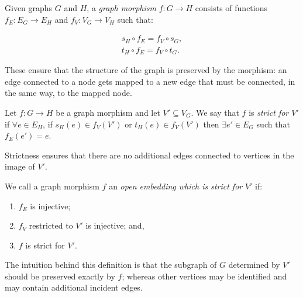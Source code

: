 \documentclass[runningheads]{llncs}
\begin{document}
Given graphs $G$ and $H$, a \emph{graph morphism} $f : G\to H$
consists of functions $f_E : E_G \to E_H$ and $f_V:V_G\to V_H$ such
that:

\begin{gather}
  s_H\circ f_E = f_V \circ s_G,\label{eq:graph-hom1}\\
  t_H\circ f_E = f_V \circ t_G\label{eq:graph-hom2}.
\end{gather}

\noindent These ensure that the structure of the graph is preserved by
the morphism: an edge connected to a node gets mapped to a new edge
that must be connected, in the same way, to the mapped node.


\begin{definition}
  Let $f: G \to H$ be a graph morphism and let $V' \subseteq V_G$. We
  say that $f$ is \emph{strict for $V'$} if $\forall e \in E_H$, if
  $s_H(e) \in f_V(V')$ or $t_H(e) \in f_V(V')$ then $\exists e' \in
  E_G$ such that $f_E(e') = e$.
\end{definition}
\noindent Strictness ensures that there are no additional
edges connected to vertices in the image of $V'$.

\begin{definition}
\label{open-embedding-def}
We call a graph morphism $f$ an \emph{open embedding which is strict for} $V'$ if:
\begin{enumerate}
\item $f_E$ is injective;
\item $f_V$ restricted to $V'$ is injective; and,
\item $f$ is strict for $V'$.
\end{enumerate}
\end{definition}

\noindent The intuition behind this definition is that the subgraph of
$G$ determined by $V'$ should be preserved exactly by $f$; 
whereas other vertices may be identified and may contain additional
incident edges.
\end{document}
